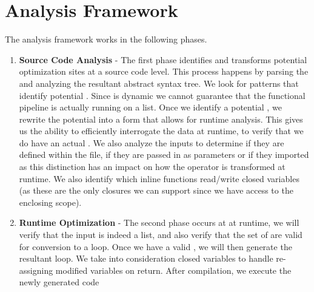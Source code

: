 \section{Analysis Framework}

The \javascript analysis framework works in the following phases.  
\begin{enumerate}
  \item \textbf{Source Code Analysis} - The first phase identifies and transforms potential optimization sites at a source code level. This process happens by parsing   the \javascript and analyzing the resultant abstract syntax tree.  We look for patterns that identify potential \pipelines.  Since \javascript is dynamic we cannot guarantee that the functional pipeline is actually running on a list.
  Once we identify a potential \pipeline, we rewrite the potential \pipeline into a form that allows for runtime analysis.  This gives us the ability to efficiently interrogate the data at runtime, to verify that we do have an actual \pipeline.  We also analyze the \pipelineoperator inputs to determine if they are defined within the file, if they are passed in as parameters or if they imported as this distinction has an impact on how the operator is transformed at runtime.  We also identify which inline functions read/write closed variables (as these are the only closures we can support since we have access to the enclosing scope).

  \item \textbf{Runtime Optimization} - The second phase occurs at at runtime, we will verify that the input is indeed a list, and also verify that the set of \pipelineoperators are valid for conversion to a  loop.  Once we have a valid \pipeline, we will then generate the resultant  loop.  We take into consideration closed variables to handle re-assigning modified variables on return. After compilation, we execute the newly generated code
\end{enumerate}